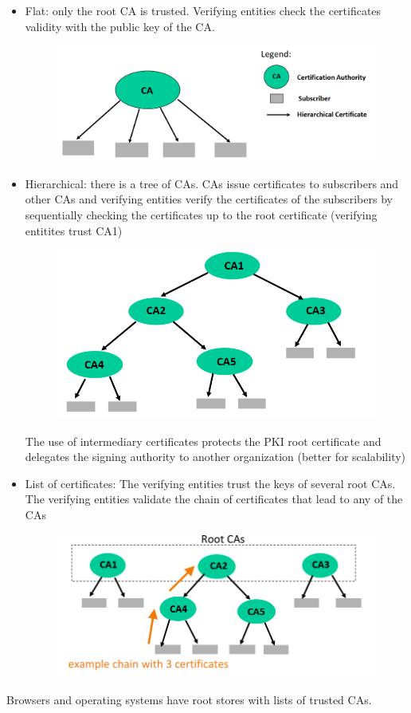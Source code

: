 \documentclass[10pt,a4paper]{report}
\begin{document}
\begin{itemize}
\item Flat: only the root CA is trusted. Verifying entities check the certificates validity with the public key of the CA.
\begin{figure}[H]
\centering
\includegraphics[scale=0.40]{24.png}
\end{figure}
\item Hierarchical: there is a tree of CAs. CAs issue certificates to subscribers and other CAs and verifying entities verify the certificates of the subscribers by
sequentially checking the certificates up to the root certificate (verifying entitites trust CA1)
\begin{figure}[H]
\centering
\includegraphics[scale=0.40]{25.png}
\end{figure}
The use of intermediary certificates protects the PKI root certificate and delegates the signing authority to another organization (better for scalability)
\item List of certificates: The verifying entities trust the keys of several root CAs. The verifying entities validate the chain of certificates that lead to any of the CAs
\begin{figure}[H]
\centering
\includegraphics[scale=0.40]{26.png}
\end{figure}
\end{itemize}
Browsers and operating systems have root stores with lists of trusted CAs.
\end{document}
